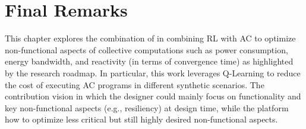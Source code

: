 \section{Final Remarks}\label{acsos2022:sec:conclusion}

This chapter explores the combination of in combining \ac{RL} with \ac{AC} 
 to optimize non-functional aspects of collective computations such as power consumption, 
 energy bandwidth, and reactivity (in terms of convergence time) as highlighted by 
 the research roadmap. 
%
In particular, this work leverages Q-Learning 
 to reduce the cost of executing \ac{AC} programs 
 in different synthetic scenarios.
%
The contribution  vision in which 
 the designer could mainly focus on functionality and key non-functional aspects (e.g., resiliency)
 at design time, while the platform  how 
 to optimize less critical but still highly desired non-functional aspects. %

\printbibliography

